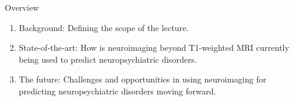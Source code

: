 \documentclass[10pt]{beamer}
\subtitle{The role of neuroimaging beyond T1-weighted MRI in the diagnosis and prediction of neuropsychiatric disorders}
\author{Esten H. Leonardsen}
\date{26.10.23}
\begin{document}
	\begin{frame}
	 	\titlepage
	\end{frame}

    \begin{frame}{Overview}
        \begin{enumerate}[label=\theenumi.]
            \item Background: Defining the scope of the lecture.
            \item State-of-the-art: How is neuroimaging beyond T1-weighted MRI currently being used to predict neuropsychiatric disorders.
            \item The future: Challenges and opportunities in using neuroimaging for predicting neuropsychiatric disorders moving forward.
        \end{enumerate}
    \end{frame}

    \newsavebox{\modalities}

    \newcommand{\stickman}[2]{
        \node[circle,fill,minimum size=2.5mm,#2] (head) at #1 {};
        \node[rounded corners=1pt,minimum height=0.65cm,minimum width=0.2cm,fill,below = 0.5pt of head,#2] (body) {};
        \draw[line width=0.5mm,round cap-round cap,#2] ([shift={(1pt,-0.5pt)}]body.north east) --++(-90:3mm);
        \draw[line width=0.5mm,round cap-round cap,#2] ([shift={(-1pt,-0.5pt)}]body.north west)--++(-90:3mm);
        \draw[thick,white,-round cap] (body.south) --++(90:2.75mm);
    }
\end{document}

